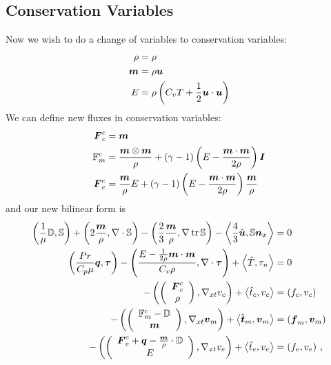 \documentclass{article}
\begin{document}
\subsection*{Conservation Variables}
Now we wish to do a change of variables to conservation variables: 
\begin{align*}
\rho&=\rho\\
\bfm&=\rho\bfu\\
E&=\rho\LRp{C_v T+\frac{1}{2}\bfu\cdot\bfu}
\end{align*}
We can define new fluxes in conservation variables:
\begin{align*}
\bfF^c_c&=\bfm\\
\mathbb{F}^c_m&=\frac{\bfm\otimes\bfm}{\rho}+(\gamma-1)\LRp{E-\frac{\bfm\cdot\bfm}{2\rho}}\bfI\\
\bfF^c_e&=\frac{\bfm}{\rho}E+(\gamma-1)\LRp{E-\frac{\bfm\cdot\bfm}{2\rho}}\frac{\bfm}{\rho}\\
\end{align*}
and our new bilinear form is
\begin{subequations}
\label{eq:conservationBF}
\begin{align}
	\LRp{\frac{1}{\mu}\mathbb{D},\mathbb{S}}+\LRp{2\frac{\bfm}{\rho},\Div\mathbb{S}}-\LRp{\frac{2}{3}\frac{\bfm}{\rho},\Grad\trace{\mathbb{S}}}
	-\LRa{\frac{4}{3}\hat\bfu,\mathbb{S}\bfn_x}&=0\\
	\LRp{\frac{Pr}{C_p\mu}\bfq,\bftau}-\LRp{\frac{E-\frac{1}{2\rho}\bfm\cdot\bfm}{C_v\rho},\Div\bftau}+\LRa{\hat T,\tau_n}&=0\\
	-\LRp{\vecttwo{\bfF^c_c}{\rho},\Gradxt v_c}+\LRa{\hat t_c,v_c}&=\LRp{f_c,v_c}\\
	-\LRp{\vecttwo{\mathbb{F}^c_m-\mathbb{D}}{\bfm},\Gradxt\bfv_m}+\LRa{\hat\bft_m,\bfv_m}&=\LRp{\bff_m,\bfv_m}\\
	-\LRp{\vecttwo{\bfF^c_e+\bfq-\frac{\bfm}{\rho}\cdot\mathbb{D}}{E},\Gradxt v_e}
	+\LRa{\hat t_e,v_e}&=\LRp{f_e,v_e}\,,
\end{align}
\end{subequations}
\end{document}
